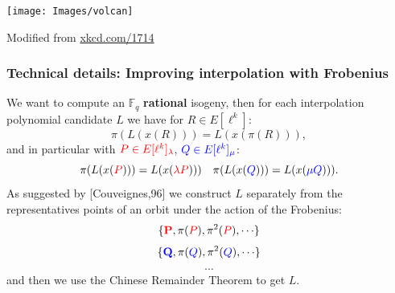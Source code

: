 \documentclass[10pt,a4paper]{beamer}
\theoremstyle{plain}
\theoremstyle{definition}
\theoremstyle{definition}
\theoremstyle{definition}
\theoremstyle{definition}
\theoremstyle{remark}
\theoremstyle{remark}
\def\red#1{\textcolor{red}{#1}}
\def\blu#1{\textcolor{blue}{#1}}
\begin{document}

% 

\begin{frame}
\begin{center}
\texttt{[image: Images/volcan]}
\end{center}
\tiny Modified from  \href{http://xkcd.com/1714/}{xkcd.com/1714}
\end{frame}


\begin{frame}
\frametitle{Technical details: Improving interpolation with Frobenius}

We want to compute an $\mathbb{F}_q$ \textbf{rational} isogeny, then for each interpolation polynomial candidate $L$ we have for $R \in E[\ell^k]$: 
\[\pi(L(x(R)))=L(x(\pi(R))),\]
and in particular with $\color{red} P \in  E[\ell^k]_{\lambda}$, $\color{blue} Q \in  E[\ell^k]_{\mu} \color{black}$:
\[\pi(L(x(\red P)))=L(x(\color{red} \lambda P \color{black}))) \quad \pi(L(x(\blu Q)))=L(x(\color{blue} \mu Q \color{black}))).\]
\pause
As suggested by [Couveignes,96] we construct $L$ separately from the representatives points of an orbit under the action of the Frobenius: 
\[
\{ {\boldmath \color{red} \textbf{P}} \unboldmath , \pi(\red P), \pi^2(\red P), \cdots \color{black} \}  
\]
\[
\{ {\boldmath \color{blue} \textbf{Q}} \unboldmath , \pi(\blu Q), \pi^2(\blu Q), \cdots \color{black} \}  
\]
\[
\cdots
\]
and then we use the Chinese  Remainder Theorem to get $L$.

\end{frame}

\end{document}
